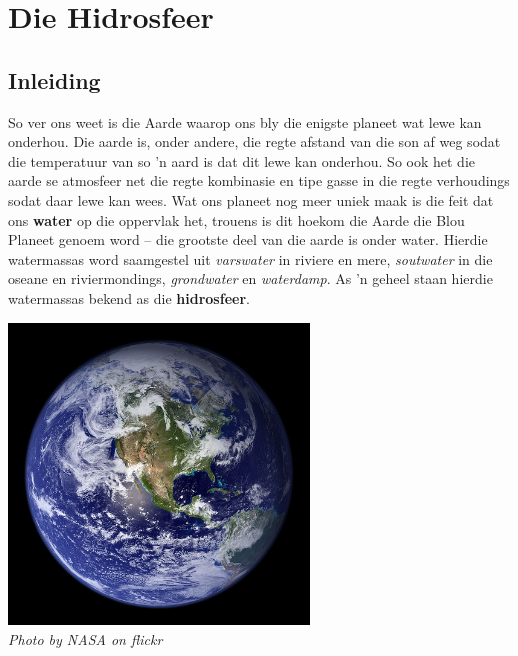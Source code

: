          \chapter{Die Hidrosfeer}

    \section{Inleiding}
            \nopagebreak
\begin{minipage}{.7\textwidth}
So ver ons weet is die Aarde waarop ons bly die enigste planeet wat lewe kan onderhou. Die aarde is, onder andere, die regte afstand van die son af weg sodat die temperatuur van so  'n aard is dat dit lewe kan onderhou. So ook het die aarde se atmosfeer net die regte kombinasie en tipe gasse in die regte verhoudings sodat daar lewe kan wees. Wat ons planeet nog meer uniek maak is die feit dat ons \textbf{water} op die oppervlak het, trouens is dit hoekom die Aarde die Blou Planeet genoem word – die grootste deel van die aarde is onder water. Hierdie watermassas word saamgestel uit \textsl{varswater} in riviere en mere, \textsl{soutwater} in die oseane en riviermondings, \textsl{grondwater} en \textsl{waterdamp}. As  'n geheel staan hierdie watermassas bekend as die \textbf{hidrosfeer}.
\end{minipage}
\begin{minipage}{.3\textwidth}
\begin{center}
 \includegraphics[width=0.6\textwidth]{photos/earth_space_nasa-flickr.jpg}\\
\textsl{Photo by NASA on flickr}
\end{center}

\end{minipage}

